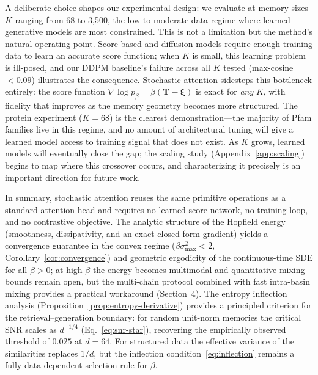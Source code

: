 A deliberate choice shapes our experimental design: we evaluate at memory sizes $K$ ranging from 68 to 3{,}500, the low-to-moderate data regime where learned generative models are most constrained. This is not a limitation but the method's natural operating point. Score-based and diffusion models require enough training data to learn an accurate score function; when $K$ is small, this learning problem is ill-posed, and our DDPM baseline's failure across all $K$ tested (max-cosine $<0.09$) illustrates the consequence. Stochastic attention sidesteps this bottleneck entirely: the score function $\nabla\log p_\beta = \beta(\mathbf{T}-\boldsymbol{\xi})$ is exact for \emph{any} $K$, with fidelity that improves as the memory geometry becomes more structured. The protein experiment ($K{=}68$) is the clearest demonstration---the majority of Pfam families live in this regime, and no amount of architectural tuning will give a learned model access to training signal that does not exist. As $K$ grows, learned models will eventually close the gap; the scaling study (Appendix~\ref{app:scaling}) begins to map where this crossover occurs, and characterizing it precisely is an important direction for future work.

In summary, stochastic attention reuses the same primitive operations as a standard attention head and requires no learned score network, no training loop, and no contrastive objective. The analytic structure of the Hopfield energy (smoothness, dissipativity, and an exact closed-form gradient) yields a convergence guarantee in the convex regime ($\beta\sigma_{\max}^{2}<2$, Corollary~\ref{cor:convergence}) and geometric ergodicity of the continuous-time SDE for all $\beta>0$; at high $\beta$ the energy becomes multimodal and quantitative mixing bounds remain open, but the multi-chain protocol combined with fast intra-basin mixing provides a practical workaround (Section~4). The entropy inflection analysis (Proposition~\ref{prop:entropy-derivative}) provides a principled criterion for the retrieval--generation boundary: for random unit-norm memories the critical SNR scales as $d^{-1/4}$ (Eq.~\ref{eq:snr-star}), recovering the empirically observed threshold of $0.025$ at $d{=}64$. For structured data the effective variance of the similarities replaces $1/d$, but the inflection condition~\eqref{eq:inflection} remains a fully data-dependent selection rule for $\beta$.

